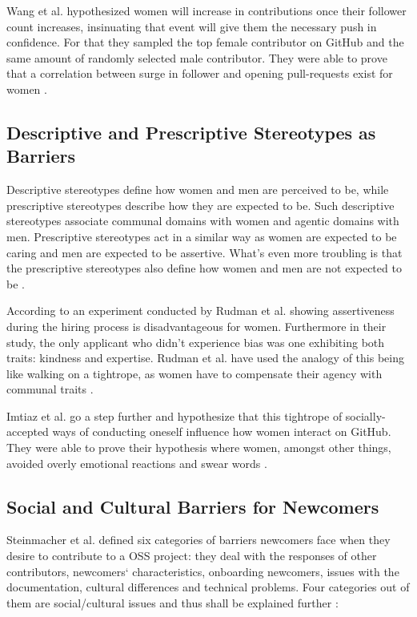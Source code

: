 \documentclass[a4paper, 11pt]{article}
\begin{document}
Wang et al. hypothesized women will increase in contributions once their follower count increases, insinuating that event will give them the necessary push in confidence. For that they sampled the top female contributor on GitHub and the same amount of randomly selected male contributor. They were able to prove that a correlation between surge in follower and opening pull-requests exist for women \cite{competence-confidence-gap}.

\subsection{Descriptive and Prescriptive Stereotypes as Barriers}
Descriptive stereotypes define how women and men are perceived to be, while prescriptive stereotypes describe how they are expected to be. Such descriptive stereotypes associate communal domains with women and agentic domains with men. Prescriptive stereotypes act in a similar way as women are expected to be caring and men are expected to be assertive. What’s even more troubling is that the prescriptive stereotypes also define how women and men are not expected to be \cite{gender-stereotypes}. \newline

According to an experiment conducted by Rudman et al. showing assertiveness during the hiring process is disadvantageous for women. Furthermore in their study, the only applicant who didn’t experience bias was one exhibiting both traits: kindness and expertise. Rudman et al. have used the analogy of this being like walking on a tightrope, as women have to compensate their agency with communal traits \cite{prescriptive-gender-stereotypes}. \newline

Imtiaz et al. go a step further and hypothesize that this tightrope of socially-accepted ways of conducting oneself influence how women interact on GitHub. They were able to prove their hypothesis where women, amongst other things, avoided overly emotional reactions and swear words \cite{gender-bias-github}.

\subsection{Social and Cultural Barriers for Newcomers}
Steinmacher et al. defined six categories of barriers newcomers face when they desire to contribute to a OSS project: they deal with the responses of other contributors, newcomers‘ characteristics, onboarding newcomers, issues with the documentation, cultural differences and technical problems. Four categories out of them are social/cultural issues and thus shall be explained further \cite{social-barriers-newcomer}:
\end{document}
